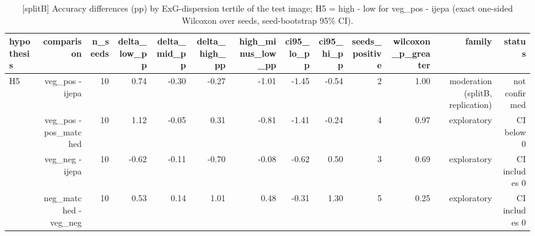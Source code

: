 \begin{table}[t]
\centering
\small
\caption{[splitB] Accuracy differences (pp) by ExG-dispersion tertile of the test image; H5 = high - low for veg\_pos - ijepa (exact one-sided Wilcoxon over seeds, seed-bootstrap 95\% CI).}
\label{tab:moderation}
\begin{tabular}{lrrrrrrrrrrrr}
\toprule
hypothesis & comparison & n\_seeds & delta\_low\_pp & delta\_mid\_pp & delta\_high\_pp & high\_minus\_low\_pp & ci95\_lo\_pp & ci95\_hi\_pp & seeds\_positive & wilcoxon\_p\_greater & family & status \\
\midrule
H5 & veg\_pos - ijepa & 10 & 0.74 & -0.30 & -0.27 & -1.01 & -1.45 & -0.54 & 2 & 1.00 & moderation (splitB, replication) & not confirmed \\
 & veg\_pos - pos\_matched & 10 & 1.12 & -0.05 & 0.31 & -0.81 & -1.41 & -0.24 & 4 & 0.97 & exploratory & CI below 0 \\
 & veg\_neg - ijepa & 10 & -0.62 & -0.11 & -0.70 & -0.08 & -0.62 & 0.50 & 3 & 0.69 & exploratory & CI includes 0 \\
 & neg\_matched - veg\_neg & 10 & 0.53 & 0.14 & 1.01 & 0.48 & -0.31 & 1.30 & 5 & 0.25 & exploratory & CI includes 0 \\
\bottomrule
\end{tabular}
\end{table}
